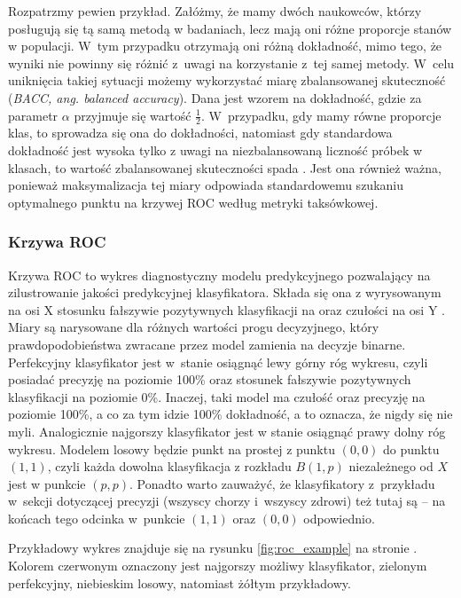 \documentclass[inzynierska]{pwr_wmat_praca_dyplomowa}
\theoremstyle{plain}
\numberwithin{theorem}{chapter}
\theoremstyle{definition}
\numberwithin{theorem}{chapter}
\begin{document}
Rozpatrzmy pewien przykład. Załóżmy, że mamy dwóch naukowców, którzy posługują się tą samą metodą w badaniach, lecz mają oni różne proporcje stanów w populacji. W~tym przypadku otrzymają oni różną dokładność, mimo tego, że wyniki nie powinny się różnić z~uwagi na korzystanie z~tej samej metody. W~celu uniknięcia takiej sytuacji możemy wykorzystać miarę zbalansowanej skuteczność (\textit{BACC, ang. balanced accuracy}). Dana jest wzorem na dokładność, gdzie za parametr $\alpha$ przyjmuje się wartość $\frac{1}{2}$. W~przypadku, gdy mamy równe proporcje klas, to sprowadza się ona do dokładności, natomiast gdy standardowa dokładność jest wysoka tylko z uwagi na niezbalansowaną liczność próbek w klasach, to wartość zbalansowanej skuteczności spada \cite{balanced_accuracy}. Jest ona również ważna, ponieważ maksymalizacja tej miary odpowiada standardowemu szukaniu optymalnego punktu na krzywej ROC według metryki taksówkowej.

\subsubsection{Krzywa ROC}

Krzywa ROC to wykres diagnostyczny modelu predykcyjnego pozwalający na zilustrowanie jakości predykcyjnej klasyfikatora. Składa się ona z wyrysowanym na osi X stosunku fałszywie pozytywnych klasyfikacji na oraz czułości na osi Y \cite{evaluation_metrics}. Miary są narysowane dla różnych wartości progu decyzyjnego, który prawdopodobieństwa zwracane przez model zamienia na decyzje binarne. Perfekcyjny klasyfikator jest w~stanie osiągnąć lewy górny róg wykresu, czyli posiadać precyzję na poziomie 100\% oraz stosunek fałszywie pozytywnych klasyfikacji na poziomie 0\%. Inaczej, taki model ma czułość oraz precyzję na poziomie 100\%, a co za tym idzie 100\% dokładność, a to oznacza, że nigdy się nie myli.  Analogicznie najgorszy klasyfikator jest w stanie osiągnąć prawy dolny róg wykresu. Modelem losowy będzie punkt na prostej z punktu $(0,0)$ do punktu $(1,1)$, czyli każda dowolna klasyfikacja z rozkładu $B(1, p)$ niezależnego od $X$ jest w punkcie $(p, p)$. Ponadto warto zauważyć, że klasyfikatory z~przykładu w~sekcji dotyczącej precyzji (wszyscy chorzy i~wszyscy zdrowi) też tutaj są -- na końcach tego odcinka w~punkcie $(1, 1)$ oraz $(0, 0)$ odpowiednio.

Przykładowy wykres znajduje się na rysunku \ref{fig:roc_example} na stronie \pageref{fig:roc_example}. Kolorem czerwonym oznaczony jest najgorszy możliwy klasyfikator, zielonym perfekcyjny, niebieskim losowy, natomiast żółtym przykładowy.
\end{document}
